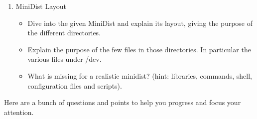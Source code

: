 \documentclass[10]{article}
\begin{document}
\begin{enumerate}
\begin{itemize}
\end{itemize}

\item MiniDist Layout
\begin{itemize}
\item Dive into the given MiniDist and explain its layout,
giving the purpose of the different directories.
\item Explain the purpose of the few files in those directories.
In particular the various files under /dev.
\item What is missing for a realistic minidist?
(hint: libraries, commands, shell, configuration files and scripts).
\end{itemize}

\end{enumerate}

Here are a bunch of questions and points to help you progress
and focus your attention.
\end{document}
